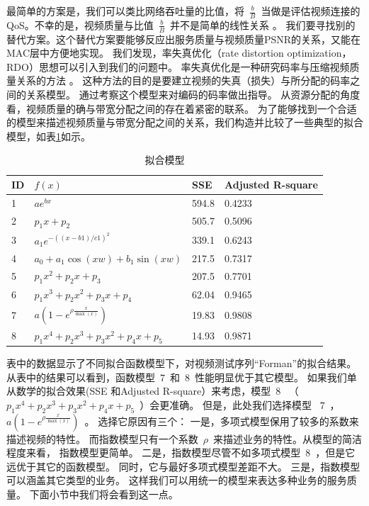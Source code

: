 \begin{enumerate}[(1)]
最简单的方案是，我们可以类比网络吞吐量的比值，将~$\frac{b}{B}$~当做是评估视频连接的QoS。不幸的是，视频质量与比值~$\frac{b}{B}$~并不是简单的线性关系
 \cite{He1013856}。
我们要寻找别的替代方案。这个替代方案要能够反应出服务质量与视频质量PSNR的关系，又能在MAC层中方便地实现。
我们发现，率失真优化（rate distortion optimization，RDO）思想可以引入到我们的问题中。
率失真优化是一种研究码率与压缩视频质量关系的方法
\cite{He1013856}\cite{E-H-Yang.TIP.2007} \cite{J-Y-Liu.ICIP.2009} 。
这种方法的目的是要建立视频的失真（损失）与所分配的码率之间的关系模型。
通过考察这个模型来对编码的码率做出指导。
从资源分配的角度看，视频质量的确与带宽分配之间的存在着紧密的联系。
为了能够找到一个合适的模型来描述视频质量与带宽分配之间的关系，我们构造并比较了一些典型的拟合模型，如表\ref{tb:chap_cacop:fit_functions}如示。
\begin{table}[tb]
\caption{拟合模型} 
\label{tb:chap_cacop:fit_functions}
\centering
\wuhao
\begin{tabularx}{0.99\linewidth}{XXXX}
\toprule
ID& $f(x)$ & SSE & Adjusted R-square\\
\midrule
1&$ae^{bx}$ & 594.8 &0.4233\\
2&$p_1 x + p_2$ & 505.7 & 0.5096\\
3&$a_1e^{-((x-b1)/c1)^2}$&339.1&0.6243\\
4&$a_0 + a_1\cos(xw) + b_1\sin(xw)$&217.5&0.7317\\
5&$p_1x^2 + p_2x + p_3$ &207.5 & 0.7701\\
6&$p_1x^3 + p_2x^2 + p_3x + p_4$&62.04&0.9465\\
7&$a(1-e^{ \rho \frac{x}{\max(x)}})$ &19.83 & 0.9808\\
8&$p_1x^4 + p_2x^3 + p_3x^2 + p_4x + p_5$&14.93 &0.9871\\
\bottomrule
\end{tabularx}
\end{table}
表中的数据显示了不同拟合函数模型下，对视频测试序列“Forman”的拟合结果。
从表中的结果可以看到，函数模型~$7$~和~$8$~性能明显优于其它模型。
如果我们单从数学的拟合效果(SSE 和Adjusted R-square）来考虑，模型~$8$~ （~$p_1x^4 + p_2x^3 + p_3x^2 + p_4x + p_5$~）会更准确。
但是，此处我们选择模型 ~$7$~，~$a(1-e^{ \rho \frac{x}{\max(x)}})$~。 
选择它原因有三个：
一是，多项式模型保用了较多的系数来描述视频的特性。
而指数模型只有一个系数~$\rho$~来描述业务的特性。从模型的简洁程度来看，
指数模型更简单。
二是，指数模型尽管不如多项式模型~$8$~，但是它远优于其它的函数模型。
同时，它与最好多项式模型差距不大。
三是，指数模型可以涵盖其它类型的业务。
这样我们可以用统一的模型来表达多种业务的服务质量。
下面小节中我们将会看到这一点。


\end{enumerate}
